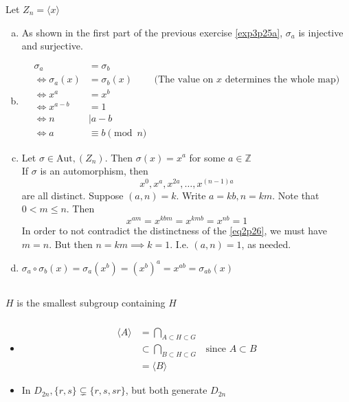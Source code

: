 \documentclass{article}
\newcommand{\ints}{\mathbb{Z}}
\newcommand{\set}[1]{ \{ #1 \} }
\newcommand{\comp}{ \circ }
\newcommand{\Aut}{ \textrm{Aut}, }
\newcommand{\divides}{\big\vert}
\newcommand{\cyclic}[1]{\langle#1\rangle}
\begin{document}
\subsubsection{}\label{ex3p26}
Let $Z_n = \cyclic{x}$
\begin{enumerate}[(a)]
\item As shown in the first part of the previous exercise \ref{exp3p25a}, $\sigma_a$ is injective and surjective.
\item 
\begin{align*}
\sigma_a &= \sigma_b\\
\iff \sigma_a(x) &= \sigma_b(x) & \mbox{(The value on $x$ determines the whole map)}\\
\iff x^a &= x^b\\
\iff x^{a-b} &= 1\\
\iff n &\divides a-b\\
\iff a &\equiv b \pmod{n}
\end{align*}
\item
Let $\sigma \in \Aut(Z_n)$. Then $\sigma(x) = x^a$ for some $a \in \ints$\\
If $\sigma$ is an automorphism, then
\begin{equation}
x^0, x^a, x^{2a},\ldots, x^{(n-1)a} \label{eq2p26}
\end{equation}
are all distinct. Suppose $(a,n)=k$. Write $a=kb,n=km$. Note that $0<m\leq n$. Then\\
\begin{equation}
x^{am} = x^{kbm} = x^{kmb} = x^{nb} = 1
\end{equation}
In order to not contradict the distinctness of the \ref{eq2p26}, we must have $m=n$. But then $n=km \implies k=1$. I.e. $(a,n)=1$, as needed.
\item
$\sigma_a\comp\sigma_b(x) = \sigma_a(x^b) = (x^b)^a = x^{ab} = \sigma_{ab}(x)$
\end{enumerate}
\subsection{}
\subsubsection{}\label{ex4p1}
$H$ is the smallest subgroup containing $H$
\subsubsection{}\label{ex4p2}
\begin{itemize}
\item
	\begin{align*}
	\cyclic{A} &= \bigcap_{A\subset H\subset G}\\
	&\subset \bigcap_{B\subset H\subset G} & \mbox{since $A\subset B$}\\
	&= \cyclic{B}
	\end{align*}
\item
	In $D_{2n}, \set{r,s} \subsetneq \set{r,s,sr}$, but both generate $D_{2n}$
\end{itemize}
\end{document}
